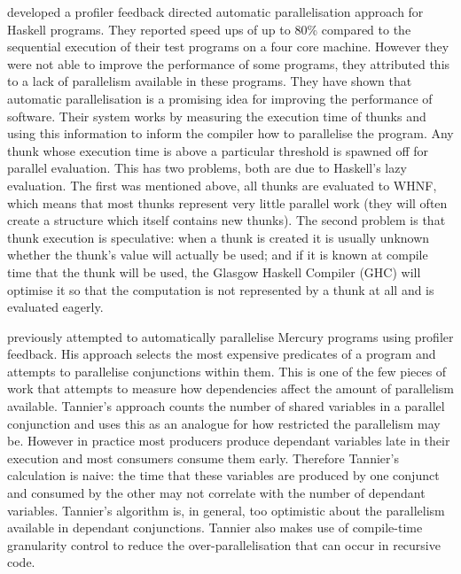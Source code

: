 \citet*{harris_07_feedback_imp_par} developed a profiler
feedback directed automatic parallelisation approach for Haskell programs.
They reported speed ups of up to 80\% compared to the sequential
execution of their test programs on a four core machine.
However they were not able to improve the performance of some
programs, they attributed this to a lack of parallelism
available in these programs.
They have shown that automatic parallelisation is a promising idea for
improving the performance of software.
Their system works by measuring the execution time of thunks and using
this information to inform the compiler how to parallelise the program.
Any thunk whose execution time is above a particular threshold is
spawned off for parallel evaluation.
This has two problems, both are due to Haskell's lazy evaluation.
The first was mentioned above, all thunks are evaluated to WHNF,
which means that most thunks represent very little parallel work
(they will often create a structure which itself contains new thunks).
The second problem is that thunk execution is speculative:
when a thunk is created it is usually unknown whether the thunk's value
will actually be used;
and if it is known at compile time that the thunk will be used,
the Glasgow Haskell Compiler (GHC) will optimise it so that the computation
is not represented by a thunk at all and is evaluated eagerly.

\citet*{tannier:2007:parallel_mercury} previously attempted to automatically
parallelise Mercury programs using profiler feedback.
His approach selects the most expensive predicates
of a program and attempts to parallelise conjunctions within them.
This is one of the few pieces of work that attempts to measure how
dependencies affect the amount of parallelism available.
Tannier's approach counts the number of shared variables in a parallel
conjunction and uses this as an analogue for how restricted the
parallelism may be.
However in practice most producers produce dependant variables late in
their execution and most consumers consume them early.
Therefore Tannier's calculation is naive:
the time that these variables are produced by one conjunct and consumed
by the other may not correlate with the number of dependant variables.
Tannier's algorithm is, in general, too optimistic
about the parallelism available in dependant conjunctions.
Tannier also makes use of compile-time granularity control to reduce the
over-parallelisation that can occur in recursive code.

